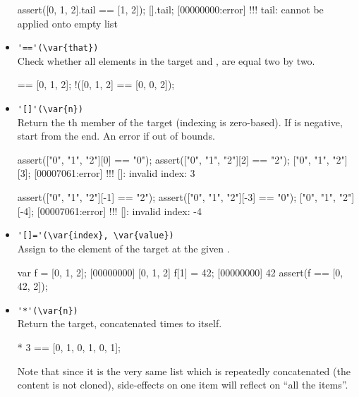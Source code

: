 \begin{itemize}
\begin{urbiscript}[firstnumber=last]
assert([0, 1, 2].tail == [1, 2]);
[].tail;
[00000000:error] !!! tail: cannot be applied onto empty list
\end{urbiscript}

\item \lstinline|'=='(\var{that})|\\
Check whether all elements in the target and , are
equal two by two.

\begin{urbiassert}[firstnumber=last]
[0, 1, 2] == [0, 1, 2];
!([0, 1, 2] == [0, 0, 2]);
\end{urbiassert}

\item \lstinline|'[]'(\var{n})|\\
  Return the th member of the target (indexing is
  zero-based). If  is negative, start from the end.  An error
  if out of bounds.

\begin{urbiscript}[firstnumber=last]
assert(["0", "1", "2"][0] == "0");
assert(["0", "1", "2"][2] == "2");
["0", "1", "2"][3];
[00007061:error] !!! []: invalid index: 3

assert(["0", "1", "2"][-1] == "2");
assert(["0", "1", "2"][-3] == "0");
["0", "1", "2"][-4];
[00007061:error] !!! []: invalid index: -4
\end{urbiscript}

\item \lstinline|'[]='(\var{index}, \var{value})|\\
  Assign  to the element of the target at the given
  .

\begin{urbiscript}[firstnumber=last]
var f = [0, 1, 2];
[00000000] [0, 1, 2]
f[1] = 42;
[00000000] 42
assert(f == [0, 42, 2]);
\end{urbiscript}

\item \lstinline|'*'(\var{n})|\\
  Return the target, concatenated  times to itself.
\begin{urbiassert}[firstnumber=last]
[0, 1] * 3 == [0, 1, 0, 1, 0, 1];
\end{urbiassert}

  Note that since it is the very same list which is repeatedly
  concatenated (the content is not cloned), side-effects on one item
  will reflect on ``all the items''.


\end{itemize}
